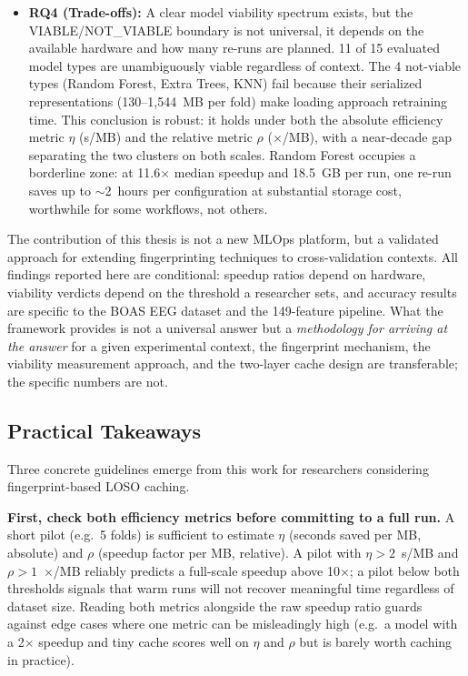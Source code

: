 \begin{itemize}
\item \textbf{RQ4 (Trade-offs):} A clear model viability spectrum exists, but
 the VIABLE\allowbreak/\allowbreak NOT\allowbreak\_\allowbreak VIABLE 
 boundary is not universal, it depends on the
 available hardware and how many re-runs are planned. 11 of 15 evaluated
 model types are unambiguously viable regardless of context. The 4
 not-viable types (Random Forest, Extra Trees, KNN) fail because their
 serialized representations (130--1{,}544~MB per fold) make loading
 approach retraining time. This conclusion is robust: it holds under
 both the absolute efficiency metric $\eta$ (s/MB) and the relative
 metric $\rho$ ($\times$/MB), with a near-decade gap separating the
 two clusters on both scales. Random Forest occupies a borderline zone:
 at 11.6$\times$ median speedup and 18.5~GB per run, one re-run saves
 up to $\sim$2~hours per configuration at substantial storage cost, 
 worthwhile for some workflows, not others.
\end{itemize}

The contribution of this thesis is not a new MLOps platform, but a validated
approach for extending fingerprinting techniques to cross-validation contexts.
All findings reported here are conditional: speedup ratios depend on hardware,
viability verdicts depend on the threshold a researcher sets, and accuracy
results are specific to the BOAS EEG dataset and the 149-feature pipeline.
What the framework provides is not a universal answer but a \textit{methodology
for arriving at the answer} for a given experimental context, the fingerprint
mechanism, the viability measurement approach, and the two-layer cache design
are transferable; the specific numbers are not.

\subsection{Practical Takeaways}

Three concrete guidelines emerge from this work for researchers considering
fingerprint-based LOSO caching.

\textbf{First, check both efficiency metrics before committing to a full run.}
A short pilot (e.g.\ 5 folds) is sufficient to estimate $\eta$ (seconds
saved per MB, absolute) and $\rho$ (speedup factor per MB, relative).
A pilot with $\eta > 2$~s/MB and $\rho > 1$~$\times$/MB reliably predicts
a full-scale speedup above 10$\times$; a pilot below both thresholds signals
that warm runs will not recover meaningful time regardless of dataset size.
Reading both metrics alongside the raw speedup ratio guards against edge
cases where one metric can be misleadingly high (e.g.\ a model with a
2$\times$ speedup and tiny cache scores well on $\eta$ and $\rho$ but is
barely worth caching in practice).

